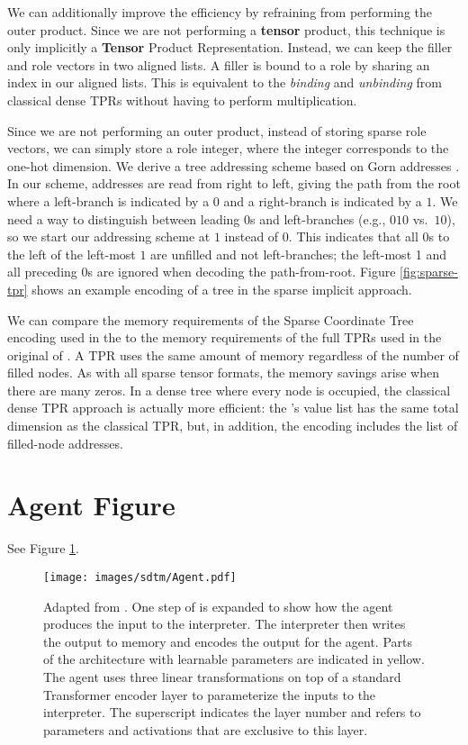 We can additionally improve the efficiency by refraining from performing the outer product. Since we are not performing a \textbf{tensor} product, this technique is only implicitly a \textbf{Tensor} Product Representation. Instead, we can keep the filler and role vectors in two aligned lists. A filler is bound to a role by sharing an index in our aligned lists. This is equivalent to the \textit{binding} and \textit{unbinding} from classical dense TPRs without having to perform multiplication.

Since we are not performing an outer product, instead of storing sparse role vectors, we can simply store a role integer, where the integer corresponds to the one-hot dimension. We derive a tree addressing scheme based on Gorn addresses \citep{gorn+1967+77+115}. In our scheme, addresses are read from right to left, giving the path from the root where a left-branch is indicated by a $0$ and a right-branch is indicated by a $1$. We need a way to distinguish between leading $0$s and left-branches (e.g., $010$ vs.\ $10$), so we start our addressing scheme at $1$ instead of $0$. This indicates that all $0$s to the left of the left-most $1$ are unfilled and not left-branches; the left-most 1 and all preceding 0s are ignored when decoding the path-from-root. Figure \ref{fig:sparse-tpr} shows an example encoding of a tree in the sparse implicit approach.

We can compare the memory requirements of the Sparse Coordinate Tree encoding used in the \sdtm to the memory requirements of the full TPRs used in the original \dtm of \citet{pmlr-v202-soulos23a}. A TPR uses the same amount of memory regardless of the number of filled nodes. As with all sparse tensor formats, the memory savings arise when there are many zeros. In a dense tree where every node is occupied, the classical dense TPR approach is actually more efficient: the \abvrepname's value list has the same total dimension as the classical TPR, but, in addition, the \abvrepname encoding includes the list of filled-node addresses.

\section{Agent Figure}
See Figure \ref{fig:agent}.
\begin{figure}
    \centering
    \texttt{[image: images/sdtm/Agent.pdf]}
    \caption{Adapted from \citet{pmlr-v202-soulos23a}. One step of \dtm is expanded to show how the agent produces the input to the interpreter. The interpreter then writes the output to memory and encodes the output for the agent. Parts of the architecture with learnable parameters are indicated in yellow. The agent uses three linear transformations on top of a standard Transformer encoder layer to parameterize the inputs to the interpreter. The superscript indicates the layer number and refers to parameters and activations that are exclusive to this layer.}
    \label{fig:agent}
\end{figure}

